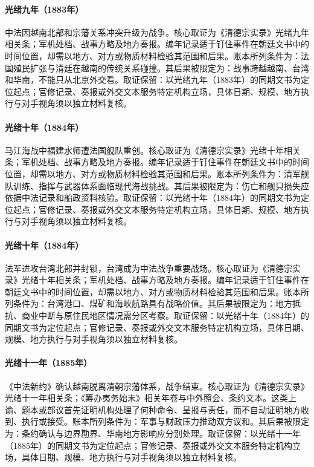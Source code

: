 \hypertarget{ledger:EQ-1883-SINO-FRENCH-WAR-BEGIN}{}\paragraph{光绪九年（1883年）}中法因越南北部和宗藩关系冲突升级为战争。核心取证为《清德宗实录》光绪九年相关条；军机处档、战事方略及地方奏报。编年记录适于钉住事件在朝廷文书中的时间位置，却需以地方、对方或物质材料检验其范围和后果。账本所列条件为：法国殖民扩张与清廷在越南的传统关系碰撞。其后果被限定为：战事跨越越南、台湾和华南，不能只从北京外交看。取证保留：以光绪九年（1883年）的同期文书为定位起点；官修记录、奏报或外交文本服务特定机构立场，具体日期、规模、地方执行与对手视角须以独立材料复核。
\hypertarget{ledger:EQ-1884-FUZHOU-NAVAL-BATTLE}{}\paragraph{光绪十年（1884年）}马江海战中福建水师遭法国舰队重创。核心取证为《清德宗实录》光绪十年相关条；军机处档、战事方略及地方奏报。编年记录适于钉住事件在朝廷文书中的时间位置，却需以地方、对方或物质材料检验其范围和后果。账本所列条件为：清军舰队训练、指挥与武器体系面临现代海战挑战。其后果被限定为：伤亡和舰只损失应依据中法记录和船政资料核验。取证保留：以光绪十年（1884年）的同期文书为定位起点；官修记录、奏报或外交文本服务特定机构立场，具体日期、规模、地方执行与对手视角须以独立材料复核。
\hypertarget{ledger:EQ-1884-TAIWAN-BLOCKADE}{}\paragraph{光绪十年（1884年）}法军进攻台湾北部并封锁，台湾成为中法战争重要战场。核心取证为《清德宗实录》光绪十年相关条；军机处档、战事方略及地方奏报。编年记录适于钉住事件在朝廷文书中的时间位置，却需以地方、对方或物质材料检验其范围和后果。账本所列条件为：台湾港口、煤矿和海峡航路具有战略价值。其后果被限定为：地方抵抗、商业中断与原住民地区情况需分区考察。取证保留：以光绪十年（1884年）的同期文书为定位起点；官修记录、奏报或外交文本服务特定机构立场，具体日期、规模、地方执行与对手视角须以独立材料复核。
\hypertarget{ledger:EQ-1885-TIANJIN-CHINA-FRANCE-TREATY}{}\paragraph{光绪十一年（1885年）}《中法新约》确认越南脱离清朝宗藩体系，战争结束。核心取证为《清德宗实录》光绪十一年相关条；《筹办夷务始末》相关年卷与中外照会、条约文本。这类上谕、题本或部议首先证明机构处理了何种命令、呈报与责任，而不自动证明地方收到、执行或接受。账本所列条件为：军事与财政压力推动双方议和。其后果被限定为：条约确认与边界勘界、华南地方影响应分别处理。取证保留：以光绪十一年（1885年）的同期文书为定位起点；官修记录、奏报或外交文本服务特定机构立场，具体日期、规模、地方执行与对手视角须以独立材料复核。
